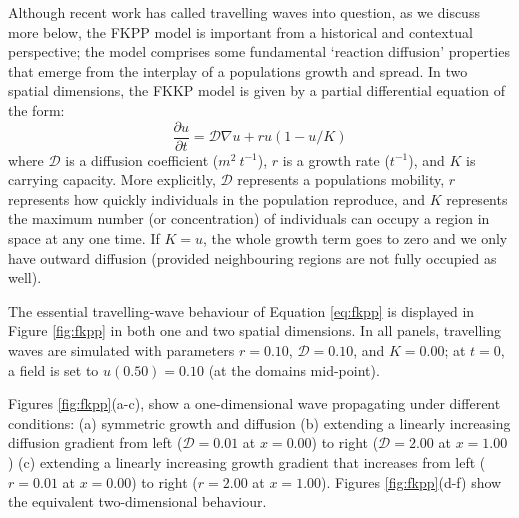 Although recent work has called travelling waves into question, as we discuss more below, 
the FKPP model is important from a historical and contextual perspective;
the model comprises some fundamental `reaction diffusion' properties that emerge from the interplay of a populations growth and spread.
In two spatial dimensions, the FKKP model is given by a partial differential equation of the form:
\begin{equation}
\label{eq:fkpp}
    \frac{\partial u}{\partial t} = \mathcal{D}\nabla u + ru(1 - u/K)
\end{equation}
where $\mathcal{D}$ is a diffusion coefficient ($m^2\ t^{-1}$), $r$ is a growth rate ($t^{-1}$),
and $K$ is carrying capacity. More explicitly, $\mathcal{D}$ represents a populations mobility, 
$r$ represents how quickly individuals in the population reproduce, and $K$ represents 
the maximum number (or concentration) of individuals can occupy a region in space at any one time.
If $K=u$, the whole growth term goes to zero and we only have outward diffusion (provided neighbouring
regions are not fully occupied as well). 

The essential travelling-wave behaviour of Equation \ref{eq:fkpp} is displayed in Figure \ref{fig:fkpp} 
in both one and two spatial dimensions. In all panels, travelling waves are simulated 
with parameters $r=0.10$, $\mathcal{D}=0.10$, and $K=0.00$; at $t=0$, a field is set to $u(0.50)=0.10$ (at the domains mid-point).

Figures \ref{fig:fkpp}(a-c), show a one-dimensional wave propagating under different conditions:
(a) symmetric growth and diffusion
(b) extending a linearly increasing diffusion gradient from left ($\mathcal{D}=0.01$ at $x=0.00$) to right
($\mathcal{D}=2.00$ at $x=1.00$)
(c) extending a linearly increasing growth gradient that increases from left ($r=0.01$ at $x=0.00$) to right
($r=2.00$ at $x=1.00$).
Figures \ref{fig:fkpp}(d-f) show the equivalent two-dimensional behaviour.


